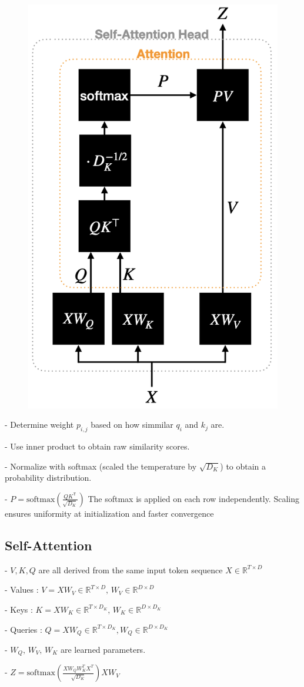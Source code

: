 \begin{figure}
  \includegraphics[width=0.4\columnwidth]{figures/self_attention.png}
\end{figure}

- Determine weight $p_{i,j}$ based on how simmilar $q_i$ and $k_j$ are.

- Use inner product to obtain raw similarity scores.

- Normalize with softmax (scaled the temperature by $\sqrt{D_{K}}$) to obtain a probability distribution.

- $P=\mathrm{softmax}\left({\frac{Q K^{\mathsf{T}}}{\sqrt{D_{K}}}}\right)$ The softmax is applied on each row independently. Scaling ensures uniformity
at initialization and faster convergence

\subsection*{Self-Attention}

- $V,K,Q$ are all derived from the same input token
sequence $X\in\mathbb{R}^{T\times D}$

- Values : $V=X W_{V}\in\mathbb{R}^{T\times D},\,W_{V}\in\mathbb{R}^{D\times D}$

- Keys : $K=X W_{K}\in\mathbb{R}^{T\times D_{K}},\,W_{K}\in\mathbb{R}^{D\times D_{K}}$

- Queries : $Q=X W_{Q}\in\mathbb{R}^{T\times D_{K}},W_{Q}\in\mathbb{R}^{D\times D_{K}}$

- $W_{Q},\,W_{V},\,W_{K}$ are learned parameters.

- $Z=\mathrm{softmax}\left(\frac{X W_{Q}W_{K}^{T}X^{T}}{\sqrt{D_{K}}}\right)X W_{V}$


